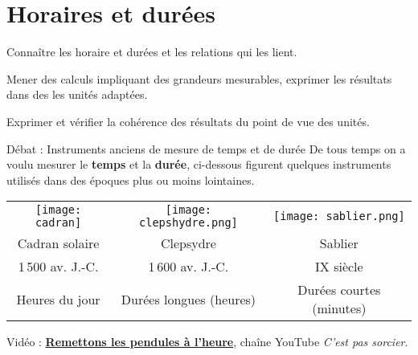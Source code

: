 \graphicspath{{../../S09_Horaires_et_durees/Images}}

\themeM
\chapter{Horaires et durées}
\label{S09}

\programme%
   {\item Connaître les horaire et durées et les relations qui les lient.}
   {\item Mener des calculs impliquant des grandeurs mesurables, exprimer les résultats dans des les unités adaptées.
    \item Exprimer et vérifier la cohérence des résultats du point de vue des unités.}

\vfill

\begin{debat}{Débat : Instruments anciens de mesure de temps et de durée}
   De tous temps on a voulu mesurer le {\bf temps} et la {\bf durée}, ci-dessous figurent quelques instruments utilisés dans des époques plus ou moins lointaines.
   \tcblower
      \begin{tabular}{*{3}{C{5}}}
         \texttt{[image: cadran]}
         &
         \texttt{[image: clepshydre.png]}
         &
         \texttt{[image: sablier.png]} \\
         Cadran solaire & Clepsydre & Sablier \\
         1\,500 av. J.-C. & 1\,600 av. J.-C. & IX siècle \\
         Heures du jour & Durées longues (heures) & Durées courtes (minutes) \\
      \end{tabular}
\end{debat}

\hfill {\gray Vidéo : \href{https://www.youtube.com/watch?v=8vMTE9U9z0U}{\bf Remettons les pendules à l'heure}, chaîne YouTube {\it C'est pas sorcier}.}


